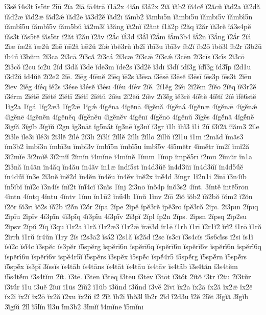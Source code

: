 {ī́3sĕ
ī́4s3t
ī́s5tr
2ī́ū
2ĭa
2ĭā
ĭā4trā
ĭ1ā2x
4ĭā́n
ĭ3ā́2x
2ĭă
ĭăb2
ĭă4cĕ́
ĭ2ăcŭ
ĭăd2a
ĭă2dă
ĭăd2æ
ĭăd2ǣ
ĭăd2ǽ
ĭăd2ē
ĭă3d2ĕ
ĭăd2ī
ĭămb2
ĭămbī5n
ĭămbī5u
ĭămbī5v
ĭămbī́5n
ĭămbī́5u
ĭămbī́5v
ĭăm5bŭ
ĭă2m3ĭ
ĭ3ăng
ĭă2nĭ
ĭ2ănt
ĭ1ă2p
ĭ2ăq
ĭ2ăr
ĭă3rĕ
ĭă3s4pĕ
ĭăs3t
ĭăs5tĕ
ĭăs5tr
ĭ2ăt
ĭ2ău
ĭ2ăv
ĭ2ắc
ĭắ3d
ĭ3ắl
ĭ2ắm
ĭắm3b4
ĭắ2n
ĭ3ắng
ĭ2ắr
2ĭá
2ĭæ
ĭæ2ă
ĭæ2ŭ
2ĭǣ
ĭǣ2ă
ĭǣ2ŭ
2ĭǽ
ĭbĕ3rŭ
ĭb2ī
ĭbī3u
ĭbī3v
ĭb2ĭ
ĭb2ō
ĭbŏ3l
ĭb2r
ĭ3b2ū
ĭb4ū́
ĭ3bŭm
2ĭ3ca
2ĭ3cā
2ĭ3că
2ĭ3cá
2ĭ3cæ
2ĭ3cǣ
2ĭ3cǽ
ĭ3cēn
2ĭ3cīs
ĭ3cī́s
2ĭ3cō
2ĭ3cŏ
ĭ2cu
ĭc2ū
2ĭd
ĭ3dă
ĭ3dē
ĭdē3m
ĭdē2s
ĭ3d2ĕ
ĭ3dī
ĭ3dĭ
ĭdĭ3g
ĭdĭ́3g
ĭd3ĭ́p
ĭ2d1u
ĭ3d2ŭ
ĭd4ŭĕ
2ĭ2e2
2ĭē.
2ĭēg
4ĭēnĕ
2ĭēq
ĭē2s
ĭ3ēsa
ĭ3ēsē
ĭ3ēsĕ
ĭ3ēsī
ĭēs3p
ĭēs3t
2ĭēu
2ĭēv
2ĭḗg
4ĭḗq
ĭḗ2s
ĭ3ḗsē
ĭ3ḗsĕ
ĭ3ḗsī
4ĭḗu
4ĭḗv
2ĭĕ.
2ĭ1ĕg
2ĭĕī
2ĭ2ĕm
2ĭĕō
2ĭĕq
ĭĕ3r2ĕ
ĭ3ĕrm
2ĭĕtē
2ĭĕtĕ
2ĭĕtī
2ĭĕtĭ
2ĭĕtŭ
2ĭĕu
2ĭ2ĕŭ
2ĭĕv
2ĭ3ĕ́g
ĭĕ́3rĕ
4ĭĕ́tĕ
4ĭĕ́tĭ
2ĭé
ĭfĕ6stĕ
1ĭg2a
1ĭgá
1ĭg2æ3
1ĭg2ǣ
1ĭgǽ
4ĭgĕna
4ĭgĕnā
4ĭgĕnă
4ĭgĕná
4ĭgĕnæ
4ĭgĕnǣ
4ĭgĕnǽ
4ĭgĕnē
4ĭgĕnĕn
4ĭgĕnĕq
4ĭgĕnĕu
4ĭgĕnĕv
4ĭgĕnī
4ĭgĕnō
4ĭgĕnŭ
3ĭgĕs
4ĭgĕ́nă
4ĭgĕ́nĕ
3ĭgĭă
3ĭgĭb
3ĭgĭŭ
ĭ2gn
ĭg3nāt
ĭg5nā́t
ĭg3nē
ĭg3nĭ
ĭ3gr
ĭ1h
ĭhĭ́3
ĭ1i
2ĭī
ĭ3ĭ2ă
ĭĭăm3
2ĭle
2ĭ3lē
ĭlē3i
ĭlḗ3i
2ĭ3lĕ
2ĭlé
2ĭ3lī
2ĭ3lĭ
2ĭllĕ
2ĭllī
2ĭllō
2ĭllŭ
ĭ2l1u
ĭ1m
ĭ2măd
ĭmăs3
ĭm3b2
ĭmbī3n
ĭmbī3u
ĭmbī3v
ĭmbī́5n
ĭmbī́5u
ĭmbī́5v
4ĭ5mĕtr
4ĭmĕ́tr
ĭm2ĭ
ĭmĭ2ă
3ĭ2mĭē
3ĭ2mĭĕ
3ĭ2mĭĭ
2ĭmĭn
ĭ4mĭnē
ĭ4mĭnĕ
1ĭmm
1ĭmp
ĭmpĕ5rī
ĭ2mu
2ĭmŭr
ĭn1a
2ĭ3nă
ĭn4ăn
ĭn4ăq
ĭn4ău
ĭn4ăv
ĭn1æ
ĭndĭ5st
ĭn4d3ŭĕ
ĭn4d3ŭī
ĭn4d3ŭĭ
ĭn4d5ŭ́ĕ
ĭn4dŭ́ĭ
ĭn3e
2ĭ3nĕ
ĭnĕ2d
ĭn4ĕn
ĭn4ĕu
ĭn4ĕv
ĭnĕ2x
ĭnĕ́4d
3ĭngr
1ĭ2n1i
2ĭnī
ĭ3n4ĭb
ĭn5ĭbĭ
ĭnĭ2c
ĭ3n4ĭs
ĭnĭ2t
ĭnĭ́4cĭ
ĭ3nĭ́s
1ĭnj
2ĭ3nō
ĭnŏ4p
ĭnŏ3s2
4ĭnt.
3ĭntĕ
ĭntĕ5rōn
4ĭntn
4ĭntq
4ĭntu
4ĭntv
1ĭnu
ĭn1ū2
ĭnū́4b
1ĭnŭ
1ĭnv
2ĭō
2ĭŏ
ĭŏb2
ĭŏ2bŏ
ĭŏm2
ĭ2ŏn
ĭ2ŏr
ĭŏ3rī
ĭŏ2s
ĭŏ́2b
ĭ2ŏ́n
ĭ2ŏ́r
2ĭpā
2ĭpē
2ĭpĕ
ĭpĕ3rĕ
ĭpĕ3rō
ĭpĕ3rŏ
2ĭpī.
2ĭ3pīn
2ĭpīq
2ĭpīu
2ĭpīv
4ĭ3pī́n
4ĭ3pī́q
4ĭ3pī́u
4ĭ3pī́v
2ĭ3pĭ
2ĭpl
ĭp2n
2ĭps.
2ĭpsn
2ĭpsq
2ĭp2su
2ĭpsv
2ĭpŭ
2ĭq
ĭ3qu
ĭ1r2a
ĭ1ră
ĭ1r2æ3
ĭ1r2ǣ
ĭrǣ3d
ĭr1ē
ĭ1rh
ĭ1rī
ĭ2r1ĭ2
ĭrĭ́2
ĭ1rō
ĭ1rŏ
2ĭrrh
ĭ1rŭ
ĭr4ŭn
ĭ1ry
2ĭs
ĭ2s3ā2
ĭsā́2
ĭ2s1ă
ĭs2ăd
ĭ2sc
ĭs3cī
ĭ3s4cĭs
ĭ5s6cĭ́ss
ĭ2si
ĭs1ĭ
ĭsĭ2c
ĭsĭ́4c
ĭ3spĕc
ĭs3pĕr
ĭ5spĕrg
ĭspĕrī6n
ĭspĕrī6q
ĭspĕrī6u
ĭspĕrī6v
ĭspĕrī́6n
ĭspĕrī́6q
ĭspĕrī́6u
ĭspĕrī́6v
ĭspĕ4r5ĭ
ĭ5spĕrs
ĭ3spĕx
ĭ5spĕ́c
ĭspĕ́4r5
ĭ5spĕ́rg
ĭ5spĕ́rn
ĭ5spĕ́rs
ĭ5spĕ́x
ĭs3pī
3ĭssĭs
ĭs4tāb
ĭs4tāns
ĭs4tāt
ĭs4tāu
ĭs4tāv
ĭs4tā́b
ĭ3s4tăn
ĭ3s4tĕm
ĭ5s4tĕ́m
ĭ3s4tĭm
2ĭt.
ĭ3tē.
ĭ3tēn
ĭ3tēq
ĭ3tēu
ĭ3tēv
ĭ3tōt
ĭ3tṓt
2ĭtŏ
ĭ3tr
ĭ2tu
2ĭ3tŭr
ĭ3tŭ́r
ĭ1u
ĭ3uĕ
2ĭuī
ĭ1ūs
2ĭŭ2
ĭ1ŭb
ĭ3ŭnd
ĭ3ŭ́nd
ĭ3vĕ
2ĭvī
ĭx2a
ĭx2ā
ĭx2ă
ĭx2ǣ
ĭx2ĕ
ĭx2ī
ĭx2ĭ
ĭx2ō
ĭx2ŏ
ĭ2xu
ĭx2ŭ
ĭ2́
2ĭ́ă
ĭ́b2ī
ĭ́bŏ3l
ĭ́b2r
2ĭ́d
ĭ́2d3u
ĭ́2ĕ
2ĭ́ĕt
3ĭ́gĭă
3ĭ́gĭb
3ĭ́gĭŭ
2ĭ́l
ĭ́5lĭn
ĭ́l3u
ĭ́m3b2
3ĭ́mĭĭ
ĭ́4mĭnē
ĭ́5mĭnī
}
